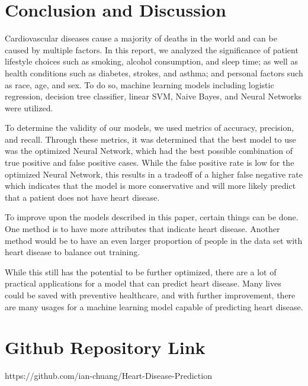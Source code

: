\documentclass[a4paper]{article}
\begin{document}
\section{Conclusion and Discussion}

Cardiovascular diseases cause a majority of deaths in the world and can be caused by multiple factors. In this report, we analyzed the significance of patient lifestyle choices such as smoking, alcohol consumption, and sleep time; as well as health conditions such as diabetes, strokes, and asthma; and personal factors such as race, age, and sex. To do so, machine learning models including logistic regression, decision tree classifier, linear SVM, Naive Bayes, and Neural Networks were utilized.

To determine the validity of our models, we used metrics of accuracy, precision, and recall. Through these metrics, it was determined that the best model to use was the optimized Neural Network, which had the best possible combination of true positive and false positive cases. While the false positive rate is low for the optimized Neural Network, this results in a tradeoff of a higher false negative rate which indicates that the model is more conservative and will more likely predict that a patient does not have heart disease.

To improve upon the models described in this paper, certain things can be done. One method is to have more attributes that indicate heart disease. Another method would be to have an even larger proportion of people in the data set with heart disease to balance out training.

While this still has the potential to be further optimized, there are a lot of practical applications for a model that can predict heart disease. Many lives could be saved with preventive healthcare, and with further improvement, there are many usages for a machine learning model capable of predicting heart disease.

\section{Github Repository Link}

https://github.com/ian-chuang/Heart-Disease-Prediction
\end{document}
